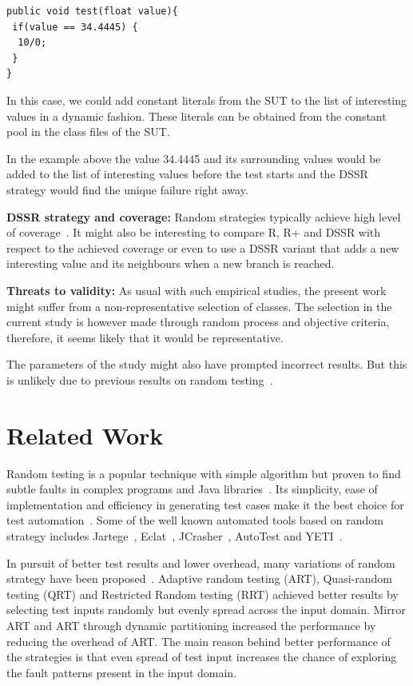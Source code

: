 \documentclass{acm_proc_article-sp}
\begin{document}
\begin{lstlisting}
public void test(float value){
 if(value == 34.4445) { 
  10/0; 
 }
}
\end{lstlisting}

In this case, we could add constant literals from the SUT to the list of interesting values in a dynamic fashion. These literals can be obtained from the constant pool in the class files of the SUT.

In the example above the value 34.4445 and its surrounding values would  be added to the list of interesting values before the test starts and the DSSR strategy would find the unique failure right away.

\textbf{DSSR strategy and coverage:} Random strategies typically achieve high level of coverage~\cite{Oriol2010}. It might also be interesting to compare R, R+ and DSSR with respect to the achieved coverage or even to use a DSSR variant that adds a new interesting value and its neighbours when a new branch is reached.


\textbf{Threats to validity:} As usual with such empirical studies, the present work might suffer from a non-representative selection of classes.
The selection in the current study is however made through random process and objective criteria, therefore, it seems likely that it would be representative.

The parameters of the study might also have prompted incorrect results. But this is unlikely due to previous results on random testing~\cite{Oriol2012}.




\section{Related Work}\label{sec:rw}

Random testing is a popular technique with simple algorithm but proven to find subtle faults in complex programs and Java libraries~\cite{Pacheco2005, Csallner2004, Claessen2000a}. Its simplicity, ease of implementation and efficiency in generating test cases make it the best choice for test automation~\cite{Hamlet1994}. Some of the well known automated tools based on random strategy includes Jartege~\cite{Oriat2004}, Eclat~\cite{Pacheco2005}, JCrasher~\cite{Csallner2004}, AutoTest \cite{Ciupa2007, Ciupa2008a} and YETI~\cite{Oriol2010, Oriol2012}.

In pursuit of better test results and lower overhead, many variations of random strategy have been proposed~\cite{Chen2010, Chen2005, Chan2002, Chen2004a, Chen2003}. Adaptive random testing (ART), Quasi-random testing (QRT) and Restricted Random testing (RRT) achieved better results by selecting test inputs randomly but evenly spread across the input domain. Mirror ART and ART through dynamic partitioning increased the performance by reducing the overhead of ART. The main reason behind better performance of the strategies is that even spread of test input increases the chance of exploring the fault patterns present in the input domain.
\end{document}
